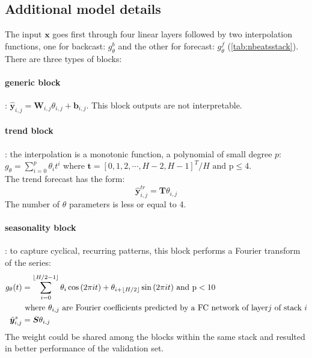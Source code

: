\documentclass{article}
\DeclarePairedDelimiter\floor{\lfloor}{\rfloor}
\newcommand{\vect}[1]{\bm{#1}} %
\newcommand{\matr}[1]{\bm{#1}} %
\begin{document}
\subsection{Additional model details}
The input $\vect{x}$ goes first through four linear layers followed by two interpolation functions, one for backcast: $g_\theta^b$ and the other for forecast: $g_\theta^f$  (\autoref{tab:nbeatsstack}).
There are three types of blocks:
\paragraph{generic block}: $\hat{\vect{y}}_{i,j} = \matr{W}_{i,j} \theta_{i,j} + \vect{b}_{i,j}$. This block outputs are not interpretable.
\paragraph{trend block}: the interpolation is a monotonic function, a polynomial of small degree $p$: \\
$g_\theta = \sum_{i=0}^p \theta_i t^i$ where $\vect{t} = [0,1,2,\cdots,H-2, H-1]^T/H \text{ and p} \le 4$. \\
The trend forecast has the form: 
\[
	\hat{\vect{y}}_{i,j}^{tr} = \matr{T} \theta_{i,j}
\]
The number of  $\theta$ parameters is less or equal to 4.
\paragraph{seasonality block}: to capture cyclical, recurring patterns, this block performs a Fourier transform of the series: 
\begin{align*}
		g_\theta (t)		&= \sum_{i=0}^{\floor*{H/2-1}} \theta_i \cos{(2 \pi it)} + \theta_{i + \floor*{H/2}}  \sin{(2 \pi it)}  \text{ and p} < 10\\
						&	\text{ where } \theta_{i,j} \text{ are Fourier coefficients predicted by a FC network of layer} j \text{ of stack } i \\
		\hat{\vect{y}}_{i,j}^{s} &= \matr{S} \theta_{i,j}		
\end{align*}
The weight could be shared among the blocks within the same stack and resulted in better performance of the validation set.
\end{document}
